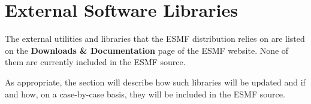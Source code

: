 
\section{External Software Libraries}
\label{sec:lib}

The external utilities and libraries that the ESMF 
distribution relies on are listed on the {\bf Downloads \&
Documentation} page of the ESMF website.  None of them are 
currently included in the ESMF source.

As appropriate, the section will describe how such libraries will be
updated and if and how, on a case-by-case basis, they will be 
included in the ESMF source.




